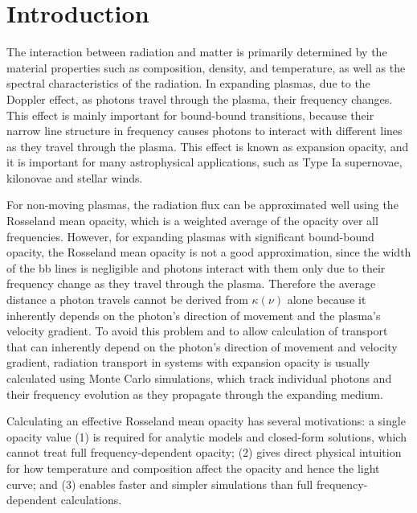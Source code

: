 \documentclass[final,5p,times,twocolumn]{elsarticle}
\begin{document}

\section{Introduction}
\label{SecIntro}

    The interaction between radiation and matter is primarily determined by the material properties such as composition, density,
    and temperature, as well as the spectral characteristics of the radiation.
    In expanding plasmas, due to the Doppler effect, as photons travel through the plasma, their frequency changes. 
    This effect is mainly important for bound-bound transitions, because their narrow line structure in frequency causes photons to interact 
    with different lines as they travel through the plasma.
    This effect is known as expansion opacity, and it is important for many astrophysical applications, such as Type Ia supernovae,
    kilonovae and stellar winds. 

    For non-moving plasmas, the radiation flux can be approximated well using the Rosseland mean opacity, which is a weighted
    average of the opacity over all frequencies. However, for expanding plasmas with significant bound-bound opacity, the Rosseland mean 
    opacity is not a good approximation, since the width of the bb lines is negligible and photons interact with them only due to their
    frequency change as they travel through the plasma. 
    Therefore the average distance a photon travels cannot be derived from $\kappa(\nu)$
    alone because it inherently depends on the photon's direction of movement and the plasma's velocity gradient.
    To avoid this problem and to allow calculation of transport that can inherently depend on the photon's direction of movement and
    velocity gradient, radiation transport in systems with expansion opacity is usually calculated using Monte Carlo simulations,
    which track individual photons and their frequency evolution as they propagate through the expanding medium.

    Calculating an effective Rosseland mean opacity has several motivations: a single opacity value 
    (1) is required for analytic 
    models and closed-form solutions, which cannot treat full frequency-dependent opacity; (2) gives direct physical 
    intuition for how temperature and composition affect the opacity and hence the light curve; and (3) enables 
    faster and simpler simulations than full frequency-dependent calculations. 
\end{document}
